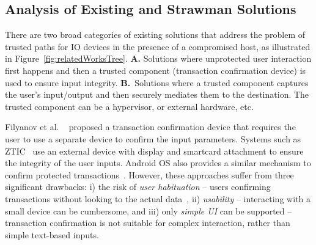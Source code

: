 \subsection{Analysis of Existing and Strawman Solutions}
\label{sec:problemStatement:existingSolution}

There are two broad categories of existing solutions that address the problem of trusted paths for IO devices in the presence of a compromised host, as illustrated in Figure~\ref{fig:relatedWorksTree}. \textbf{A.} Solutions where unprotected user interaction first happens and then a trusted component (transaction confirmation device) is used to ensure input integrity. \textbf{B.}~Solutions where a trusted component captures the user's input/output and then securely mediates them to the destination. The trusted component can be a hypervisor, or external hardware, etc. %

 Filyanov et al. ~\cite{filyanov2011uni} proposed a transaction confirmation device that requires the user to use a separate device to confirm the input parameters. Systems such as ZTIC~\cite{weigold2011secure} use an external device with display and smartcard attachment to ensure the integrity of the user inputs. Android OS also provides a similar mechanism to confirm protected transactions~\cite{android_confirm}. 
However, these approaches suffer from three significant drawbacks: i) the risk of \emph{user habituation} -- users confirming transactions without looking to the actual data~\cite{anderson2016warning},
ii) \emph{usability} -- interacting with a small device can be cumbersome, and iii) only \emph{simple UI} can be supported -- transaction confirmation is not suitable for complex interaction, rather than simple text-based inputs.


